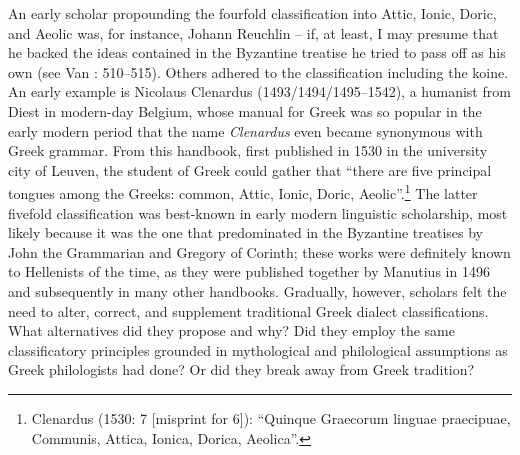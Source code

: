 An early scholar propounding the fourfold classification into Attic, Ionic, Doric, and Aeolic was, for instance, Johann Reuchlin – if, at least, I may presume that he backed the ideas contained in the Byzantine treatise he tried to pass off as his own (see Van \citealt{Rooy2014}: 510–515). Others adhered to the classification including the koine. An early example is Nicolaus Clenardus (1493/1494/1495–1542), a humanist from Diest in modern-day Belgium, whose manual for Greek was so popular in the early modern period that the name \textit{Clenardus} even became synonymous with Greek grammar. From this handbook, first published in 1530 in the university city of Leuven, the student of Greek could gather that “there are five principal tongues among the Greeks: common, Attic, Ionic, Doric, Aeolic”.\footnote{Clenardus (1530: 7 [misprint for 6]): “Quinque Graecorum linguae praecipuae, Communis, Attica, Ionica, Dorica, Aeolica”.} The latter fivefold classification was best-known in early modern linguistic scholarship, most likely because it was the one that predominated in the Byzantine treatises by John the Grammarian and Gregory of Corinth; these works were definitely known to Hellenists of the time, as they were published together by Manutius in 1496 and subsequently in many other handbooks. Gradually, however, scholars felt the need to alter, correct, and supplement traditional Greek dialect classifications. What alternatives did they propose and why? Did they employ the same classificatory principles grounded in mythological and philological assumptions as Greek philologists had done? Or did they break away from Greek tradition?

